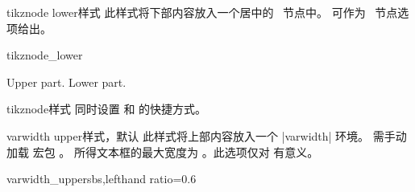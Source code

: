 \begin{docTcbKey}{tikznode lower}{}{样式}
  此样式将下部内容放入一个居中的 \tikzname\ 节点中。
   可作为 \tikzname\ 节点选项给出。
\begin{exdispExample}{tikznode_lower}
\begin{tcolorbox}[bicolor,colback=LightBlue!50!white,colbacklower=white,
  colframe=black,tikznode lower={inner sep=2pt,draw=red,fill=yellow}]
Upper part.
\tcblower
Lower part.
\end{tcolorbox}
\end{exdispExample}
\end{docTcbKey}

\begin{docTcbKey}{tikznode}{}{样式}
  同时设置  和  的快捷方式。
\end{docTcbKey}


\begin{docTcbKey}{varwidth upper}{}{样式，默认 }
  此样式将上部内容放入一个 |varwidth| 环境。
  需手动加载  宏包 \cite{arseneau:2011a}。
  所得文本框的最大宽度为 。此选项仅对  有意义。
\begin{exdispExample*}{varwidth_upper}{sbs,lefthand ratio=0.6}

\end{exdispExample*}
\end{docTcbKey}

\clearpage

